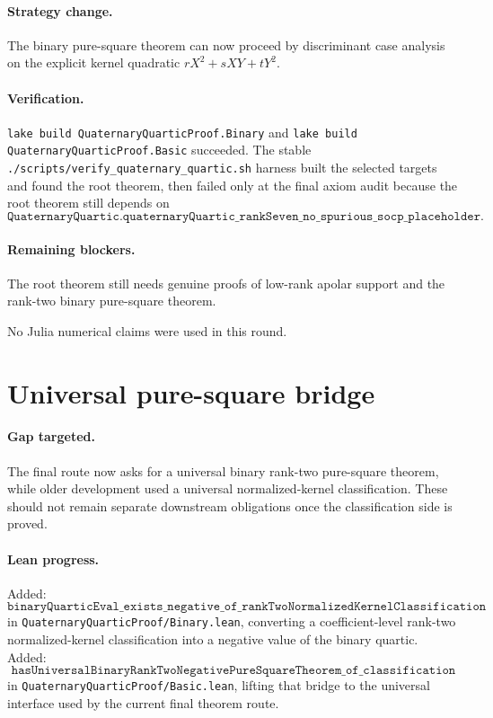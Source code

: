 \documentclass[11pt]{article}
\begin{document}
\paragraph{Strategy change.}
The binary pure-square theorem can now proceed by discriminant case analysis on
the explicit kernel quadratic \(rX^2+sXY+tY^2\).

\paragraph{Verification.}
\texttt{lake build QuaternaryQuarticProof.Binary} and
\texttt{lake build QuaternaryQuarticProof.Basic} succeeded.  The stable
\texttt{./scripts/verify\_quaternary\_quartic.sh} harness built the selected
targets and found the root theorem, then failed only at the final axiom audit
because the root theorem still depends on
\[
\texttt{QuaternaryQuartic.quaternaryQuartic\_rankSeven\_no\_spurious\_socp\_placeholder}.
\]

\paragraph{Remaining blockers.}
The root theorem still needs genuine proofs of low-rank apolar support and the
rank-two binary pure-square theorem.

No Julia numerical claims were used in this round.

\section*{Universal pure-square bridge}

\paragraph{Gap targeted.}
The final route now asks for a universal binary rank-two pure-square theorem,
while older development used a universal normalized-kernel classification.
These should not remain separate downstream obligations once the
classification side is proved.

\paragraph{Lean progress.}
Added:
\[
\texttt{binaryQuarticEval\_exists\_negative\_of\_rankTwoNormalizedKernelClassification}
\]
in \texttt{QuaternaryQuarticProof/Binary.lean}, converting a coefficient-level
rank-two normalized-kernel classification into a negative value of the binary
quartic.  Added:
\[
\texttt{hasUniversalBinaryRankTwoNegativePureSquareTheorem\_of\_classification}
\]
in \texttt{QuaternaryQuarticProof/Basic.lean}, lifting that bridge to the
universal interface used by the current final theorem route.
\end{document}
